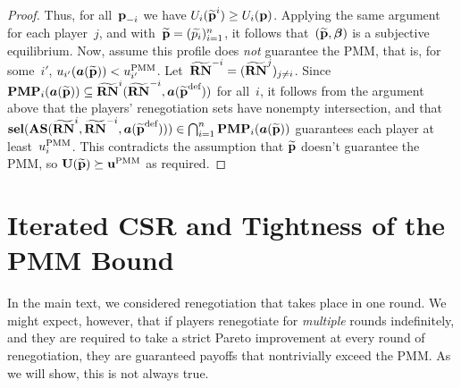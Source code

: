 \documentclass[sigconf]{aamas}
\newcommand{\selection}{sel}%
\newcommand{\renegb}{\mathbf{\selection}}
\theoremstyle{definition}
\begin{document}
\begin{proof}


Thus, for all~$\textbf{p}_{-i}$ we have
$U_i({\widetilde{\textbf{p}}^i}) \geq U_i(\textbf{p})$.
Applying the same
argument for each player~$j$,
and with~$\widetilde{\textbf{p}} = (\widetilde{p_i})_{i=1}^{{n}}$,
it follows that~$(\widetilde{\textbf{p}}, \boldsymbol{\beta})$
is a subjective equilibrium.
Now, assume this profile does \textit{not} guarantee the PMM,
that is, 
for some~$i'$, 
$u_{i'}(\boldsymbol{a}(\widetilde{\textbf{p}})) < u_{i'}^{\textnormal{PMM}}$.
Let~${\widetilde{\mathbf{RN}}}^{-i} = ({\widetilde{\mathbf{RN}}}^{j})_{j \neq i}$.
Since~$\mathbf{PMP}_i(\boldsymbol{a}(\widetilde{\textbf{p}})) \subseteq {\widetilde{\mathbf{RN}}}^{i}({\widetilde{\mathbf{RN}}}^{-i}, \boldsymbol{a}({\widetilde{\textbf{p}}}^{\textnormal{def}}))$
for all~$i$,
it follows from the argument above that the players'
renegotiation sets have nonempty
intersection,
and that~$\renegb(\intsect(\newrenegi, \newrenegmi, \fullact(\defprog{\newfullprog}))) \in \bigcap_{i=1}^{{n}} \yudproji(\fullact(\newfullprog))$ guarantees
each player at least~$u_i^{\textnormal{PMM}}$.
This contradicts the assumption that
$\widetilde{\textbf{p}}$ doesn't guarantee
the PMM,
so $\textbf{U}(\widetilde{\textbf{p}}) \succeq \textbf{u}^{\textnormal{PMM}}$ as required.
\end{proof}




\section{Iterated CSR and Tightness of the PMM Bound}
\label{app:proof:ineff}

In the main
text,
we considered renegotiation that takes place in one round.
We might expect, however, that
if 
players
renegotiate
for \textit{multiple}
rounds
indefinitely,
and they are required
to take a strict Pareto
improvement
at every round of renegotiation,
they are guaranteed
payoffs that nontrivially
exceed
the PMM.
As we will
show,
this is not always true.
\end{document}

